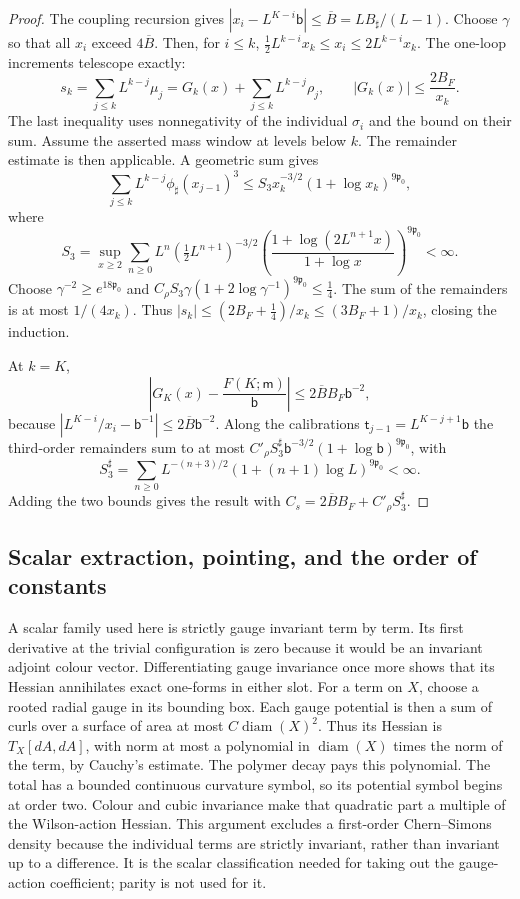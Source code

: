 \documentclass[11pt,letterpaper,reqno]{amsart}
\theoremstyle{definition}
\theoremstyle{remark}
\begin{document}
\begin{proof}
The coupling recursion gives
$|x_i-L^{K-i}\mathsf b|\le\overline B=LB_\sharp/(L-1)$.
Choose $\gamma$ so that all $x_i$ exceed $4\overline B$.
Then, for $i\le k$,
$\frac12L^{k-i}x_k\le x_i\le2L^{k-i}x_k$.
The one-loop increments telescope exactly:
\[
 s_k=\sum_{j\le k}L^{k-j}\mu_j
       =G_k(x)+\sum_{j\le k}L^{k-j}\rho_j,
 \qquad |G_k(x)|\le\frac{2B_F}{x_k}.
\]
The last inequality uses nonnegativity of the individual
$\sigma_i$ and the bound on their sum.
Assume the asserted mass window at levels below $k$.
The remainder estimate is then applicable.  A geometric sum gives
\[
 \sum_{j\le k}L^{k-j}\phi_\sharp(x_{j-1})^3
 \le S_3x_k^{-3/2}(1+\log x_k)^{9\mathfrak p_0},
\]
where
\[
 S_3=\sup_{x\ge2}\sum_{n\ge0}
 L^n(\tfrac12L^{n+1})^{-3/2}
 \left(\frac{1+\log(2L^{n+1}x)}{1+\log x}\right)^{9\mathfrak p_0}
 <\infty.
\]
Choose $\gamma^{-2}\ge e^{18\mathfrak p_0}$ and
$C_\rho S_3\gamma(1+2\log\gamma^{-1})^{9\mathfrak p_0}\le\frac14$.
The sum of the remainders is at most $1/(4x_k)$.
Thus $|s_k|\le(2B_F+\frac14)/x_k\le(3B_F+1)/x_k$,
closing the induction.

At $k=K$,
\[
 \left|G_K(x)-\frac{F(K;\mathsf m)}{\mathsf b}\right|
 \le 2\overline B B_F\mathsf b^{-2},
\]
because
$|L^{K-i}/x_i-\mathsf b^{-1}|\le2\overline B\mathsf b^{-2}$.
Along the calibrations $\mathsf t_{j-1}=L^{K-j+1}\mathsf b$ the
third-order remainders sum to at most
$C'_\rho S_3^\sharp\mathsf b^{-3/2}
(1+\log\mathsf b)^{9\mathfrak p_0}$, with
\[
 S_3^\sharp=\sum_{n\ge0}L^{-(n+3)/2}
                    (1+(n+1)\log L)^{9\mathfrak p_0}<\infty.
\]
Adding the two bounds gives the result with
$C_s=2\overline BB_F+C'_\rho S_3^\sharp$.
\end{proof}

\subsection{Scalar extraction, pointing, and the order of constants}

A scalar family used here is strictly gauge invariant term
by term.  Its first derivative at the trivial configuration
is zero because it would be an invariant adjoint colour
vector.  Differentiating gauge invariance once more shows
that its Hessian annihilates exact one-forms in either slot.
For a term on $X$, choose a rooted radial gauge in its
bounding box.  Each gauge potential is then a sum of curls
over a surface of area at most $C\operatorname{diam}(X)^2$.
Thus its Hessian is $T_X[dA,dA]$, with norm at most a
polynomial in $\operatorname{diam}(X)$ times the norm of
the term, by Cauchy's estimate.  The polymer decay pays
this polynomial.  The total has a bounded continuous
curvature symbol, so its potential symbol begins at
order two.  Colour and cubic invariance make that
quadratic part a multiple of the Wilson-action Hessian.
This argument excludes a first-order Chern--Simons
density because the individual terms are strictly
invariant, rather than invariant up to a difference.
It is the scalar classification needed for
taking out the gauge-action coefficient; parity is
not used for it.
\end{document}
